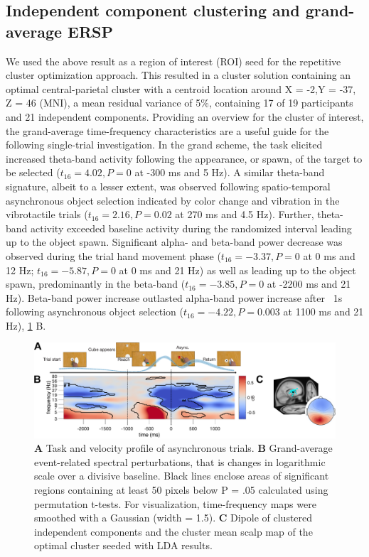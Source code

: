 \subsection{Independent component clustering and grand-average ERSP}
We used the above result as a region of interest (ROI) seed for the repetitive cluster optimization approach. This resulted in a cluster solution containing an optimal central-parietal cluster with a centroid location around X = -2,Y = -37, Z = 46 (MNI), a mean residual variance of 5\%, containing 17 of 19 participants and 21 independent components. Providing an overview for the cluster of interest, the grand-average time-frequency characteristics are a useful guide for the following single-trial investigation. In the grand scheme, the task elicited increased theta-band activity following the appearance, or spawn, of the target to be selected ($t_{16} = 4.02, P = 0$ at -300 ms and 5 Hz). A similar theta-band signature, albeit to a lesser extent, was observed following spatio-temporal asynchronous object selection indicated by color change and vibration in the vibrotactile trials ($t_{16} = 2.16, P = 0.02$ at 270 ms and 4.5 Hz). Further, theta-band activity exceeded baseline activity during the randomized interval leading up to the object spawn. Significant alpha- and beta-band power decrease was observed during the trial hand movement phase ($t_{16} = -3.37, P = 0$ at 0 ms and 12 Hz; $t_{16} = -5.87, P = 0$ at 0 ms and 21 Hz) as well as leading up to the object spawn, predominantly in the beta-band ($t_{16} = -3.85, P = 0$ at -2200 ms and 21 Hz). Beta-band power increase outlasted alpha-band power increase after ~1s following asynchronous object selection ($t_{16} = -4.22, P = 0.003$ at 1100 ms and 21 Hz), \ref{grand_average_ersp} B.
\begin{figure}[t]
  \includegraphics[width=\textwidth]{figures/fig3_context_grand-average_short.pdf}
  \caption{\textbf{A} Task and velocity profile of asynchronous trials. \textbf{B} Grand-average event-related spectral perturbations, that is changes in logarithmic scale over a divisive baseline. Black lines enclose areas of significant regions containing at least 50 pixels below P = .05 calculated using permutation t-tests. For visualization, time-frequency maps were smoothed with a Gaussian (width = 1.5). \textbf{C} Dipole of clustered independent components and the cluster mean scalp map of the optimal cluster seeded with LDA results.}
  \label{grand_average_ersp}
\end{figure}

